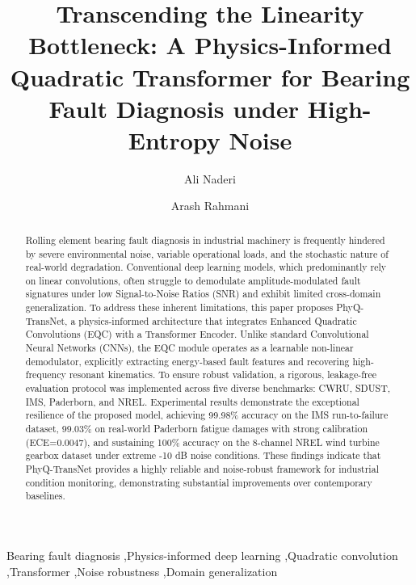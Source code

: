 \documentclass[5p,times,twocolumn]{elsarticle}
\begin{document}
\begin{frontmatter}

    \title{Transcending the Linearity Bottleneck: A Physics-Informed Quadratic Transformer for Bearing Fault Diagnosis under High-Entropy Noise}

    \author[1]{Ali Naderi}
    \address[1]{Department of Mechatronics Engineering, Urmia University of Technology, Urmia, Iran}
    \author[2]{Arash Rahmani}
    \address[2]{Department of Mechanical Engineering, Urmia University of Technology, Urmia, Iran}


\begin{abstract}
Rolling element bearing fault diagnosis in industrial machinery is frequently hindered by severe environmental noise, variable operational loads, and the stochastic nature of real-world degradation. Conventional deep learning models, which predominantly rely on linear convolutions, often struggle to demodulate amplitude-modulated fault signatures under low Signal-to-Noise Ratios (SNR) and exhibit limited cross-domain generalization. To address these inherent limitations, this paper proposes PhyQ-TransNet, a physics-informed architecture that integrates Enhanced Quadratic Convolutions (EQC) with a Transformer Encoder. Unlike standard Convolutional Neural Networks (CNNs), the EQC module operates as a learnable non-linear demodulator, explicitly extracting energy-based fault features and recovering high-frequency resonant kinematics. To ensure robust validation, a rigorous, leakage-free evaluation protocol was implemented across five diverse benchmarks: CWRU, SDUST, IMS, Paderborn, and NREL. Experimental results demonstrate the exceptional resilience of the proposed model, achieving 99.98\% accuracy on the IMS run-to-failure dataset, 99.03\% on real-world Paderborn fatigue damages with strong calibration (ECE=0.0047), and sustaining 100\% accuracy on the 8-channel NREL wind turbine gearbox dataset under extreme -10 dB noise conditions. These findings indicate that PhyQ-TransNet provides a highly reliable and noise-robust framework for industrial condition monitoring, demonstrating substantial improvements over contemporary baselines.
\end{abstract}

\begin{keyword}
Bearing fault diagnosis \sep Physics-informed deep learning \sep Quadratic convolution \sep Transformer \sep Noise robustness \sep Domain generalization
\end{keyword}

\end{frontmatter}
\end{document}
